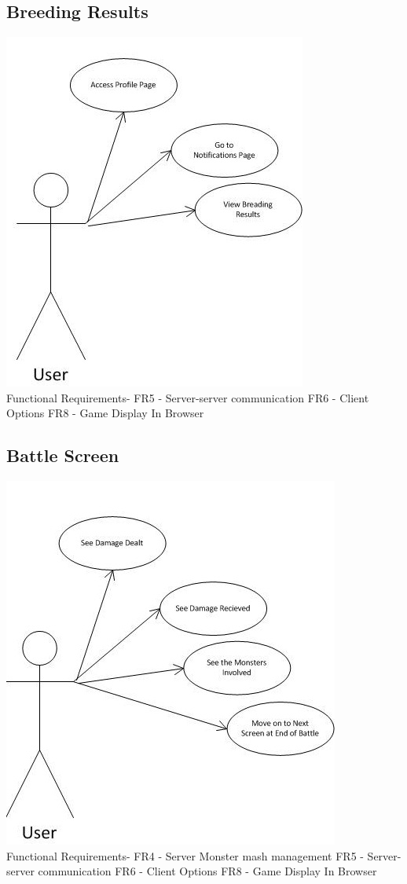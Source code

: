 \documentclass{project}
\begin{document}
\newpage
\subsection{Breeding Results}
\includegraphics[scale=0.6]{BreedingResultsPageUseCase.jpg}
\\
Functional Requirements-
FR5 - Server-server communication
FR6 - Client Options
FR8 - Game Display In Browser

\newpage
\subsection{Battle Screen}
\includegraphics[scale=0.6]{BattleScreenUseCase.jpg}
\\
Functional Requirements-
FR4 - Server Monster mash management
FR5 - Server-server communication
FR6 - Client Options
FR8 - Game Display In Browser
\end{document}

